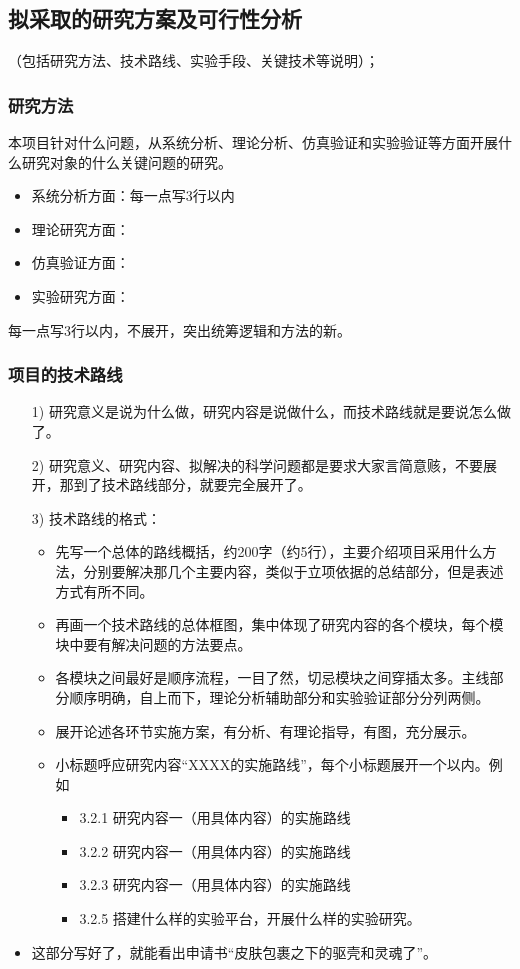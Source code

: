 \subsection{拟采取的研究方案及可行性分析}
（包括研究方法、技术路线、实验手段、关键技术等说明）；
\subsubsection{研究方法}
本项目针对什么问题，从系统分析、理论分析、仿真验证和实验验证等方面开展什么研究对象的什么关键问题的研究。
\begin{itemize}
\item 系统分析方面：每一点写3行以内
\item 理论研究方面：
\item 仿真验证方面：
\item 实验研究方面：
\end{itemize}
每一点写3行以内，不展开，突出统筹逻辑和方法的新。


\subsubsection{项目的技术路线}
\begin{itemize}
\item[1)] 研究意义是说为什么做，研究内容是说做什么，而技术路线就是要说怎么做了。

\item[2)] 研究意义、研究内容、拟解决的科学问题都是要求大家言简意赅，不要展开，那到了技术路线部分，就要完全展开了。

\item[3)] 技术路线的格式：
\begin{itemize}
\item 先写一个总体的路线概括，约200字（约5行），主要介绍项目采用什么方法，分别要解决那几个主要内容，类似于立项依据的总结部分，但是表述方式有所不同。

\item 再画一个技术路线的总体框图，集中体现了研究内容的各个模块，每个模块中要有解决问题的方法要点。

\item 各模块之间最好是顺序流程，一目了然，切忌模块之间穿插太多。主线部分顺序明确，自上而下，理论分析辅助部分和实验验证部分分列两侧。

\item 展开论述各环节实施方案，有分析、有理论指导，有图，充分展示。

\item 小标题呼应研究内容“XXXX的实施路线”，每个小标题展开一个以内。例如
	\begin{itemize}
	\item 3.2.1 研究内容一（用具体内容）的实施路线
	\item 3.2.2 研究内容一（用具体内容）的实施路线
	\item 3.2.3 研究内容一（用具体内容）的实施路线
	\item 3.2.5 搭建什么样的实验平台，开展什么样的实验研究。
\end{itemize}
\end{itemize}
\item 这部分写好了，就能看出申请书“皮肤包裹之下的驱壳和灵魂了”。
\end{itemize}


